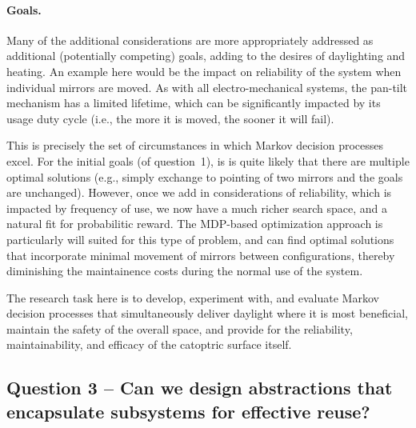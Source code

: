 \paragraph{Goals.}
Many of the additional considerations are more appropriately addressed as
additional (potentially competing) goals, adding to the desires of
daylighting and heating.  An example here would be the
impact on reliability of the system when individual mirrors are moved.  As
with all electro-mechanical systems, the pan-tilt mechanism has a limited
lifetime, which can be significantly impacted by its usage duty cycle
(i.e., the more it is moved, the sooner it will fail).

This is precisely the set of circumstances in which Markov decision
processes excel. For the initial goals (of question~1), is is quite
likely that there are multiple optimal solutions (e.g., simply exchange
to pointing of two mirrors and the goals are unchanged).  However,
once we add in considerations of reliability, which is impacted by
frequency of use, we now have a much richer search space,
and a natural fit for probabilitic reward.
The MDP-based optimization approach is particularly will suited for
this type of problem, and can find optimal solutions that incorporate
minimal movement of mirrors between configurations, thereby diminishing
the maintainence costs during the normal use of the system.

The research task here is to develop, experiment with, and evaluate
Markov decision processes that simultaneously deliver daylight where it
is most beneficial, maintain the safety of the overall space,
and provide for the reliability, maintainability, and efficacy of the
catoptric surface itself.

\subsection{Question 3 -- Can we design abstractions that encapsulate
subsystems for effective reuse?}

